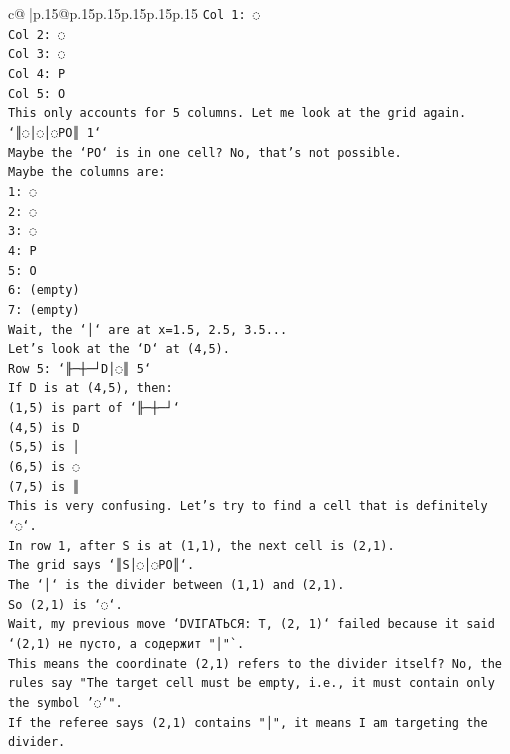 \documentclass{article}
\begin{document}
{\begin{supertabular}{c@{$\;$}|p{.15\linewidth}@{}p{.15\linewidth}p{.15\linewidth}p{.15\linewidth}p{.15\linewidth}p{.15\linewidth}}
{{{\texttt{Col 1: ◌} \\
\texttt{Col 2: ◌} \\
\texttt{Col 3: ◌} \\
\texttt{Col 4: P} \\
\texttt{Col 5: O} \\
\texttt{This only accounts for 5 columns. Let me look at the grid again.} \\
\texttt{`║◌│◌│◌PO║ 1`} \\
\texttt{Maybe the `PO` is in one cell? No, that's not possible.} \\
\texttt{Maybe the columns are:} \\
\texttt{1: ◌} \\
\texttt{2: ◌} \\
\texttt{3: ◌} \\
\texttt{4: P} \\
\texttt{5: O} \\
\texttt{6: (empty)} \\
\texttt{7: (empty)} \\
\texttt{Wait, the `│` are at x=1.5, 2.5, 3.5...} \\
\texttt{Let's look at the `D` at (4,5).} \\
\texttt{Row 5: `╟─┼─┘D│◌║ 5`} \\
\texttt{If D is at (4,5), then:} \\
\texttt{(1,5) is part of `╟─┼─┘`} \\
\texttt{(4,5) is D} \\
\texttt{(5,5) is │} \\
\texttt{(6,5) is ◌} \\
\texttt{(7,5) is ║} \\
\texttt{This is very confusing. Let's try to find a cell that is definitely `◌`.} \\
\texttt{In row 1, after S is at (1,1), the next cell is (2,1).} \\
\texttt{The grid says `║S│◌│◌PO║`.} \\
\texttt{The `│` is the divider between (1,1) and (2,1).} \\
\texttt{So (2,1) is `◌`.} \\
\texttt{Wait, my previous move `DVIГАТЬСЯ: T, (2, 1)` failed because it said `(2,1) не пусто, а содержит "│"`.} \\
\texttt{This means the coordinate (2,1) refers to the divider itself? No, the rules say "The target cell must be empty, i.e., it must contain only the symbol '◌'".} \\
\texttt{If the referee says (2,1) contains "│", it means I am targeting the divider.} \\
}}}
\end{supertabular}}
\end{document}
